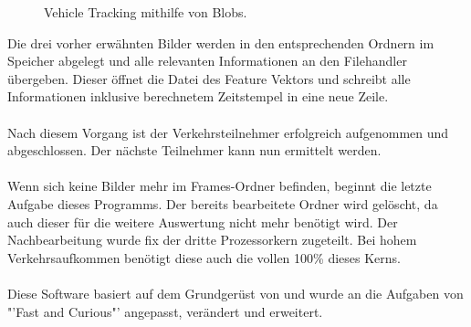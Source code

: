\begin{figure}[H]
\caption{Vehicle Tracking mithilfe von Blobs.}
\label{bMotionDetection}
\end{figure}

Die drei vorher erwähnten Bilder werden in den entsprechenden Ordnern im Speicher abgelegt und alle relevanten Informationen an den Filehandler übergeben. Dieser öffnet die Datei des Feature Vektors und schreibt alle Informationen inklusive berechnetem Zeitstempel in eine neue Zeile. \\\\
Nach diesem Vorgang ist der Verkehrsteilnehmer erfolgreich aufgenommen und abgeschlossen. Der nächste Teilnehmer kann nun ermittelt werden.\\\\
Wenn sich keine Bilder mehr im Frames-Ordner befinden, beginnt die letzte Aufgabe dieses Programms. Der bereits bearbeitete Ordner wird gelöscht, da auch dieser für die weitere Auswertung nicht mehr benötigt wird. Der Nachbearbeitung wurde fix der dritte Prozessorkern zugeteilt. Bei hohem Verkehrsaufkommen benötigt diese auch die vollen 100\% dieses Kerns.\\\\
Diese Software basiert auf dem Grundgerüst von \cite{OpenCVCC} und wurde an die Aufgaben von "'Fast and Curious"' angepasst, verändert und erweitert.

